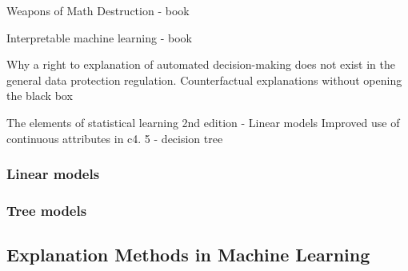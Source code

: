 \documentclass[english]{tktltiki2}
\theoremstyle{definition}
\theoremstyle{remark}
\begin{document}
\citet{cathy2017weapons} Weapons of Math Destruction - book
\par
\citet{molnarinterpretable} Interpretable machine learning - book
\newline \par

Why a right to explanation of automated decision-making does not exist in the general data protection regulation. \newline
Counterfactual explanations without opening the black box \newline \newline


The elements of statistical learning 2nd edition - Linear models \newline
Improved use of continuous attributes in c4. 5 - decision tree


\subsubsection{Linear models}

\subsubsection{Tree models}

\subsection{Explanation Methods in Machine Learning} %
\end{document}
